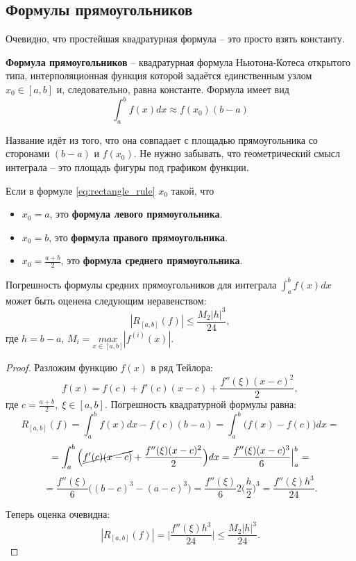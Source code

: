 \documentclass[../main.tex]{subfile}
\begin{document}
\subsection{Формулы прямоугольников}
Очевидно, что простейшая квадратурная формула -- это просто взять константу.

\begin{define}\label{eq:rectangle_rule}
	\textbf{Формула прямоугольников} -- квадратурная формула Ньютона-Котеса
	открытого типа, интерполяционная функция которой задаётся единственным
	узлом $x_0\in[a,b]$ и, следовательно, равна константе. Формула имеет вид
	\[\boxed{\int_{a}^{b}f(x)dx\approx f(x_0)(b-a)}\]
\end{define}

Название идёт из того, что она совпадает с площадью прямоугольника со сторонами
$(b-a)$ и $f(x_0)$. Не нужно забывать, что геометрический смысл интеграла -- это
площадь фигуры под графиком функции.

\begin{define}\label{eq:rectangle_rule_vars}
	Если в формуле \eqref{eq:rectangle_rule} $x_0$ такой, что
	\begin{itemize}[noitemsep, nolistsep]
		\item $x_0=a$, это \textbf{формула левого прямоугольника}.
		\item $x_0=b$, это \textbf{формула правого прямоугольника}.
		\item $x_0=\frac{a+b}{2}$, это \textbf{формула среднего
			прямоугольника}.
	\end{itemize}
	

\end{define}

\begin{theorem}
\label{eq:middle_rectangle_rule_error}
	Погрешность формулы средних прямоугольников для интеграла $\int_a^b
	f(x)dx$ может быть оценена следующим неравенством:
	\[\boxed{|R_{[a,b]}(f)|\le\frac{M_2|h|^3}{24}},\]
	где $h=b-a$, $M_i=\underset{x\in[a,b]}{max}|f^{(i)}(x)|.$
\end{theorem}

\begin{proof}
	Разложим функцию $f(x)$ в ряд Тейлора:
	\[f(x)=f(c)+f'(c)(x-c)+\frac{f''(\xi)(x-c)^2}{2},\]
	где $c=\frac{a+b}{2},\;\xi\in[a,b].$ Погрешность квадратурной формулы
	равна:
	\[R_{[a,b]}(f)=\int_a^b f(x)dx - f(c)(b-a)=\int_a^b\big(f(x) - f(c)\big)
	dx=\]
	\[=\int_a^b \Big(\cancel{f'(c)(x-c)}+\frac{f''(\xi)(x-c)^2}{2}\Big)dx=
	\frac{f''(\xi)(x-c)^3}{6}\Big|_a^b=\]
	\[=\frac{f''(\xi)}{6}\Big((b-c)^3-(a-c)^3\Big)=\frac{f''(\xi)}{6}2\Big(
	\frac{h}{2}\Big)^3=\frac{f''(\xi)h^3}{24}.\]

	Теперь оценка очевидна:
	\[|R_{[a,b]}(f)|=\Big|\frac{f''(\xi)h^3}{24}\Big|\le\frac{M_2|h|^3}{24}.
	\]
\end{proof}
\end{document}
